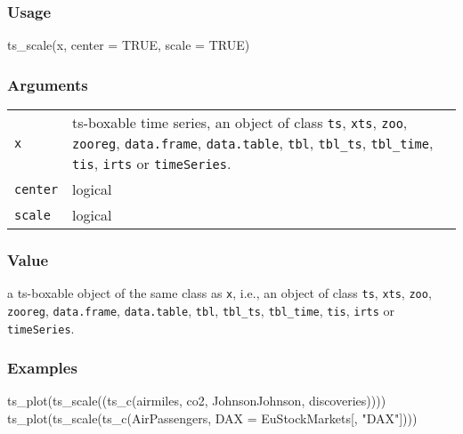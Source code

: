 \documentclass[
  letterpaper,
  DIV=11,
  numbers=noendperiod]{scrreport}
\newenvironment{Shaded}{\begin{snugshade}}{\end{snugshade}}
\newcommand{\AttributeTok}[1]{\textcolor[rgb]{0.40,0.45,0.13}{#1}}
\newcommand{\ConstantTok}[1]{\textcolor[rgb]{0.56,0.35,0.01}{#1}}
\newcommand{\FunctionTok}[1]{\textcolor[rgb]{0.28,0.35,0.67}{#1}}
\newcommand{\NormalTok}[1]{\textcolor[rgb]{0.00,0.23,0.31}{#1}}
\newcommand{\StringTok}[1]{\textcolor[rgb]{0.13,0.47,0.30}{#1}}
\begin{document}
\subsubsection{Usage}\label{usage-32}

\begin{Shaded}
\begin{Highlighting}[]
\FunctionTok{ts\_scale}\NormalTok{(x, }\AttributeTok{center =} \ConstantTok{TRUE}\NormalTok{, }\AttributeTok{scale =} \ConstantTok{TRUE}\NormalTok{)}
\end{Highlighting}
\end{Shaded}

\subsubsection{Arguments}\label{arguments-32}

\begin{longtable}[]{@{}ll@{}}
\toprule\noalign{}
\endhead
\bottomrule\noalign{}
\endlastfoot
\texttt{x} & ts-boxable time series, an object of class \texttt{ts},
\texttt{xts}, \texttt{zoo}, \texttt{zooreg}, \texttt{data.frame},
\texttt{data.table}, \texttt{tbl}, \texttt{tbl\_ts}, \texttt{tbl\_time},
\texttt{tis}, \texttt{irts} or \texttt{timeSeries}. \\
\texttt{center} & logical \\
\texttt{scale} & logical \\
\end{longtable}

\subsubsection{Value}\label{value-32}

a ts-boxable object of the same class as \texttt{x}, i.e., an object of
class \texttt{ts}, \texttt{xts}, \texttt{zoo}, \texttt{zooreg},
\texttt{data.frame}, \texttt{data.table}, \texttt{tbl},
\texttt{tbl\_ts}, \texttt{tbl\_time}, \texttt{tis}, \texttt{irts} or
\texttt{timeSeries}.

\subsubsection{Examples}\label{examples-32}

\begin{Shaded}
\begin{Highlighting}[]
\FunctionTok{ts\_plot}\NormalTok{(}\FunctionTok{ts\_scale}\NormalTok{((}\FunctionTok{ts\_c}\NormalTok{(airmiles, co2, JohnsonJohnson, discoveries))))}
\FunctionTok{ts\_plot}\NormalTok{(}\FunctionTok{ts\_scale}\NormalTok{(}\FunctionTok{ts\_c}\NormalTok{(AirPassengers, }\AttributeTok{DAX =}\NormalTok{ EuStockMarkets[, }\StringTok{"DAX"}\NormalTok{])))}
\end{Highlighting}
\end{Shaded}
\end{document}
